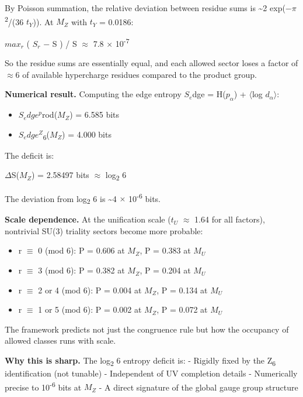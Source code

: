 \documentclass[11pt,a4paper]{article}
\theoremstyle{remark}
\providecommand{\tightlist}{%
  \setlength{\itemsep}{0pt}\setlength{\parskip}{0pt}}
\begin{document}
By Poisson summation, the relative deviation between residue sums is \textasciitilde2 exp(\ensuremath{-}\ensuremath{\pi}\textsuperscript{2}/(36 \(t_Y\))). At \(M_Z\) with \(t_Y\) = 0.0186:

\(max_r\) \textbar( \(S_r\) \ensuremath{-} S ) / S\textbar{} \ensuremath{\approx} 7.8 \ensuremath{\times} 10\textsuperscript{-7}

So the residue sums are essentially equal, and each allowed sector loses a factor of \ensuremath{\approx}6 of available hypercharge residues compared to the product group.

\textbf{Numerical result.} Computing the edge entropy \(S_e\)dge = H(\(p_\ensuremath{\alpha}\)) + \ensuremath{\langle}log \(d_\ensuremath{\alpha}\)\ensuremath{\rangle}:

\begin{itemize}
\tightlist
\item
  \(S_edge^p\)rod(\(M_Z\)) = 6.585 bits
\item
  \(S_edge^Z\)\textsubscript{6}(\(M_Z\)) = 4.000 bits
\end{itemize}

The deficit is:

\ensuremath{\Delta}S(\(M_Z\)) = 2.58497 bits \ensuremath{\approx} log\textsubscript{2} 6

The deviation from log\textsubscript{2} 6 is \textasciitilde4 \ensuremath{\times} 10\textsuperscript{-6} bits.

\textbf{Scale dependence.} At the unification scale (\(t_U\) \ensuremath{\approx} 1.64 for all
factors), nontrivial SU(3) triality sectors become more probable:

\begin{itemize}
\tightlist
\item
  r \ensuremath{\equiv} 0 (mod 6): P = 0.606 at \(M_Z\), P = 0.383 at \(M_U\)
\item
  r \ensuremath{\equiv} 3 (mod 6): P = 0.382 at \(M_Z\), P = 0.204 at \(M_U\)
\item
  r \ensuremath{\equiv} 2 or 4 (mod 6): P = 0.004 at \(M_Z\), P = 0.134 at \(M_U\)
\item
  r \ensuremath{\equiv} 1 or 5 (mod 6): P = 0.002 at \(M_Z\), P = 0.072 at \(M_U\)
\end{itemize}

The framework predicts not just the congruence rule but how the occupancy
of allowed classes runs with scale.

\textbf{Why this is sharp.} The log\textsubscript{2} 6 entropy deficit is:
- Rigidly fixed by the Z\textsubscript{6} identification (not tunable)
- Independent of UV completion details
- Numerically precise to 10\textsuperscript{-6} bits at \(M_Z\)
- A direct signature of the global gauge group structure
\end{document}
